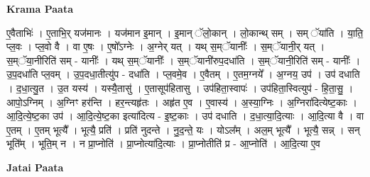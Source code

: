 \documentclass[17pt]{extarticle}
\begin{document}
\textbf{Krama Paata} \newline

ए॒वैताभिः॑ । ए॒ताभि॒र् यज॑मानः । यज॑मान इ॒मान् । इ॒मान् ॅलो॒कान् । लो॒कान्थ् सम् । सम् ॅया॑ति । या॒ति॒ प्ल॒वः । प्ल॒वो वै । वा ए॒षः । ए॒षो᳚ऽग्नेः । अ॒ग्नेर् यत् । यथ् स॒म्ॅयानीः᳚ । स॒म्ॅयानी॒र् यत् । स॒म्ॅया॒नीरिति॑ सम् - यानीः᳚ । यथ् स॒म्ॅयानीः᳚ । स॒म्ॅयानी॑रुप॒दधा॑ति । स॒म्ॅयानी॒रिति॑ सम् - यानीः᳚ । उ॒प॒दधा॑ति प्ल॒वम् । उ॒प॒दधा॒तीत्यु॑प - दधा॑ति । प्ल॒वमे॒व । ए॒वैतम् । ए॒तम॒ग्नये᳚ । अ॒ग्नय॒ उप॑ । उप॑ दधाति । द॒धा॒त्यु॒त । उ॒त यस्य॑ । यस्यै॒तासु॑ । ए॒तासूप॑हितासु । उप॑हिता॒स्वापः॑ । उप॑हिता॒स्वित्युप॑ - हि॒ता॒सु॒ । आपो॒ऽग्निम् । अ॒ग्निꣳ हर॑न्ति । हर॒न्त्यहृ॑तः । अहृ॑त ए॒व । ए॒वास्य॑ । अ॒स्या॒ग्निः । अ॒ग्निरा॑दित्येष्ट॒काः । आ॒दि॒त्ये॒ष्ट॒का उप॑ । आ॒दि॒त्ये॒ष्ट॒का इत्या॑दित्य - इ॒ष्ट॒काः । उप॑ दधाति । द॒धा॒त्या॒दि॒त्याः । आ॒दि॒त्या वै । वा ए॒तम् । ए॒तम् भूत्यै᳚ । भूत्यै॒ प्रति॑ । प्रति॑ नुदन्ते । नु॒द॒न्ते॒ यः । योऽल᳚म् । अल॒म् भूत्यै᳚ । भूत्यै॒ सन्न् । सन् भूति᳚म् । भूति॒म् न । न प्रा॒प्नोति॑ । प्रा॒प्नोत्या॑दि॒त्याः । प्रा॒प्नोतीति॑ प्र - आ॒प्नोति॑ । आ॒दि॒त्या ए॒व \newline

\textbf{Jatai Paata} \newline
\end{document}
